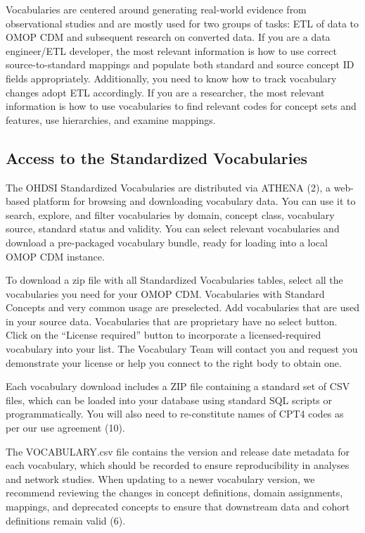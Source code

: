 \documentclass[
  letterpaper,
  paper=7in:10in,
  pagesize=pdftex,
  headinclude=on,
  footinclude=on,
  12pt]{scrbook}
\begin{document}
Vocabularies are centered around generating real-world evidence from
observational studies and are mostly used for two groups of tasks: ETL
of data to OMOP CDM and subsequent research on converted data. If you
are a data engineer/ETL developer, the most relevant information is how
to use correct source-to-standard mappings and populate both standard
and source concept ID fields appropriately. Additionally, you need to
know how to track vocabulary changes adopt ETL accordingly. If you are a
researcher, the most relevant information is how to use vocabularies to
find relevant codes for concept sets and features, use hierarchies, and
examine mappings.

\subsection{Access to the Standardized
Vocabularies}\label{access-to-the-standardized-vocabularies}

The OHDSI Standardized Vocabularies are distributed via ATHENA (2), a
web-based platform for browsing and downloading vocabulary data. You can
use it to search, explore, and filter vocabularies by domain, concept
class, vocabulary source, standard status and validity. You can select
relevant vocabularies and download a pre-packaged vocabulary bundle,
ready for loading into a local OMOP CDM instance.

To download a zip file with all Standardized Vocabularies tables, select
all the vocabularies you need for your OMOP CDM. Vocabularies with
Standard Concepts and very common usage are preselected. Add
vocabularies that are used in your source data. Vocabularies that are
proprietary have no select button. Click on the ``License required''
button to incorporate a licensed-required vocabulary into your list. The
Vocabulary Team will contact you and request you demonstrate your
license or help you connect to the right body to obtain one.

Each vocabulary download includes a ZIP file containing a standard set
of CSV files, which can be loaded into your database using standard SQL
scripts or programmatically. You will also need to re-constitute names
of CPT4 codes as per our use agreement (10).

The VOCABULARY.csv file contains the version and release date metadata
for each vocabulary, which should be recorded to ensure reproducibility
in analyses and network studies. When updating to a newer vocabulary
version, we recommend reviewing the changes in concept definitions,
domain assignments, mappings, and deprecated concepts to ensure that
downstream data and cohort definitions remain valid (6).
\end{document}
